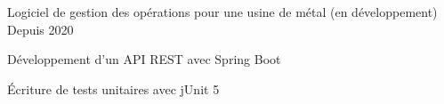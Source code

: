 

\begin{cventries}

  \cventry
    {Logiciel de gestion des opérations pour une usine de métal (en développement)} %
    {} %
    {} %
    {Depuis 2020} %
    {
      \begin{cvitems} %
        \item {Développement d'un API REST avec Spring Boot}
        \item {Écriture de tests unitaires avec jUnit 5}
      \end{cvitems}
    }

\end{cventries}
